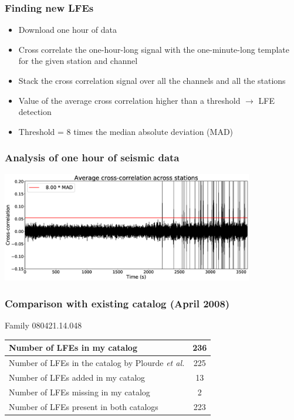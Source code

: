 \documentclass{beamer}
\begin{document}
	\begin{frame}
		\frametitle{Finding new LFEs}
		\begin{itemize}
			\item Download one hour of data
			\item Cross correlate the one-hour-long signal with the one-minute-long template for the given station and channel
			\item Stack the cross correlation signal over all the channels and all the stations
			\item Value of the average cross correlation higher than a threshold $\rightarrow$ LFE detection
			\item Threshold = 8 times the median absolute deviation (MAD)
		\end{itemize}
	\end{frame}

	\begin{frame}
		\frametitle{Analysis of one hour of seismic data}
		\begin{center}
			\includegraphics[width=11cm, trim={0cm 0cm 0cm 0cm}, clip]{catalog_SC/20080421_130000.eps}
		\end{center}
	\end{frame}

	\begin{frame}
		\frametitle{Comparison with existing catalog (April 2008)}
		\begin{center}
		Family 080421.14.048

		\vspace{2em}

		\begin{tabular}{| l | c |}
			\hline
			Number of LFEs in my catalog & 236 \\
			\hline
			Number of LFEs in the catalog by Plourde \textit{et al.} & 225 \\
			\hline
			Number of LFEs added in my catalog & 13 \\
			\hline
			Number of LFEs missing in my catalog & 2 \\
			\hline
			Number of LFEs present in both catalogs & 223 \\
			\hline
		\end{tabular}
		\end{center}
	\end{frame}
\end{document}
